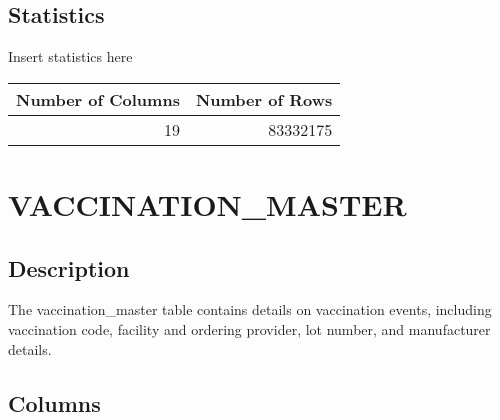 \documentclass[
  letterpaper,
  DIV=11,
  numbers=noendperiod]{scrreprt}
\begin{document}
\hypertarget{statistics-43}{%
\section*{Statistics}\label{statistics-43}}

Insert statistics here

\begin{longtable}{rr}
\toprule
Number of Columns & Number of Rows \\ 
\midrule
19 & 83332175 \\ 
\bottomrule
\end{longtable}

\hypertarget{vaccination_master}{%
\chapter*{VACCINATION\_MASTER}\label{vaccination_master}}

\hypertarget{description-44}{%
\section*{Description}\label{description-44}}

The vaccination\_master table contains details on vaccination events,
including vaccination code, facility and ordering provider, lot number,
and manufacturer details.

\hypertarget{columns-44}{%
\section*{Columns}\label{columns-44}}
\end{document}
